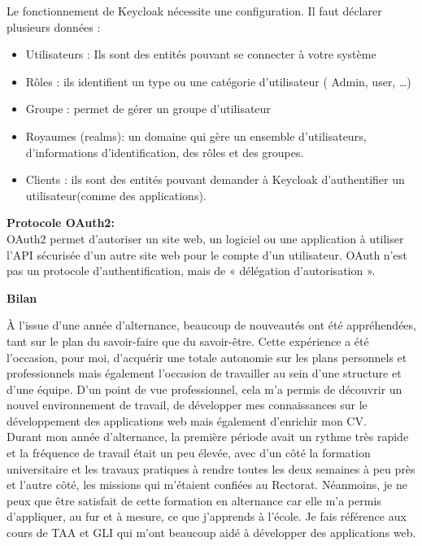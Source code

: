 \documentclass[12pt]{article}
\begin{document}
Le fonctionnement de Keycloak nécessite une configuration. Il faut déclarer plusieurs données : 
\begin{itemize}
\item Utilisateurs : Ils sont des entités pouvant se connecter à votre système
\item Rôles : ils identifient un type ou une catégorie d’utilisateur ( Admin, user, …)
\item Groupe : permet de gérer un groupe d’utilisateur
\item Royaumes (realms): un domaine qui gère un ensemble d’utilisateurs, d’informations d’identification, des rôles et des groupes.
\item Clients : ils sont des entités pouvant demander à Keycloak d’authentifier un utilisateur(comme des applications).
\end{itemize}
 
\textbf{Protocole OAuth2:}\\ 

OAuth2 permet d'autoriser un site web, un logiciel ou une application à utiliser l'API sécurisée d'un autre site web pour le compte d'un utilisateur. OAuth n'est pas un protocole d'authentification, mais de « délégation d'autorisation ».
\newpage

\begin{center}
\bfseries {Bilan}
\end{center}

À l'issue d'une année d'alternance, beaucoup de nouveautés ont été appréhendées, tant sur le plan du savoir-faire que du savoir-être. Cette expérience a été l'occasion, pour moi, d'acquérir une totale autonomie sur les plans personnels et professionnels mais également l'occasion de travailler au sein d'une structure et d'une équipe. D'un point de vue professionnel, cela m'a permis de découvrir un nouvel environnement de travail, de développer mes connaissances sur le développement des applications web mais également d'enrichir mon CV. \\


Durant mon année d'alternance, la première période avait un rythme très rapide et la fréquence de travail était un peu élevée, avec d'un côté la formation universitaire et les travaux pratiques à rendre toutes les deux semaines à peu près et l'autre côté, les missions qui m'étaient confiées au Rectorat. Néanmoins, je ne peux que être satisfait de cette formation en alternance car elle m'a permis d'appliquer, au fur et à mesure, ce que j’apprends à l'école. Je fais référence aux cours de TAA et GLI qui m'ont beaucoup aidé à développer des applications web. \\
\end{document}
